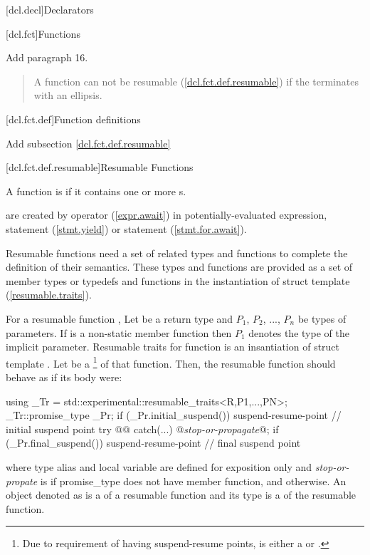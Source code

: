 
[dcl.decl]{Declarators}

\setcounter{section}{3}
\setcounter{subsection}{4}
[dcl.fct]{Functions}%

Add paragraph 16.

\begin{quote}
\setcounter{Paras}{15}
\pnum
A function can not be resumable (\ref{dcl.fct.def.resumable}) if the  terminates with an ellipsis.
\end{quote}

\setcounter{section}{3}
[dcl.fct.def]{Function definitions}

Add subsection \ref{dcl.fct.def.resumable}

\setcounter{subsection}{3}
[dcl.fct.def.resumable]{Resumable Functions}


\pnum
A function is  if it contains
one or more s. 

\pnum
{} are created by  operator (\ref{expr.await}) in potentially-evaluated expression,
 statement (\ref{stmt.yield}) 
or  statement (\ref{stmt.for.await}).

\pnum
Resumable functions need a set of related types and functions
to complete the definition of their semantics.
These types and functions are provided as a set of member types or typedefs
and functions in the instantiation of struct template
 (\ref{resumable.traits}). 

\pnum
For a resumable function , Let  be a return type and $P_1$, $P_2$, ..., $P_n$
be types of parameters. If  is a non-static member function then $P_1$ denotes the type of the implicit  parameter. 
Resumable traits for function  is an insantiation of
struct template .
Let  be a 
\footnote{
Due to requirement of having suspend-resume points,
 is either a
 or 
.
}
of that function. Then, the resumable function 
should behave as if its body were:
\begin{codeblock}
  {
     using _Tr = std::experimental::resumable_traits<R,P1,...,PN>;
     _Tr::promise_type _Pr;
     if (_Pr.initial_suspend()) {
       suspend-resume-point // initial suspend point
     }
     try { @@ }
     catch(...) {
       @\textit{stop-or-propagate}@;
     }
     if (_Pr.final_suspend()) {
       suspend-resume-point // final suspend point
     }
  }
\end{codeblock}
where type alias  and local variable  are 
defined for
exposition only and
\textit{stop-or-propate} is  
if promise_type does not have  member function, and  otherwise. An object denoted as  is a  of
a resumable function and its type is a 
of the resumable function.

